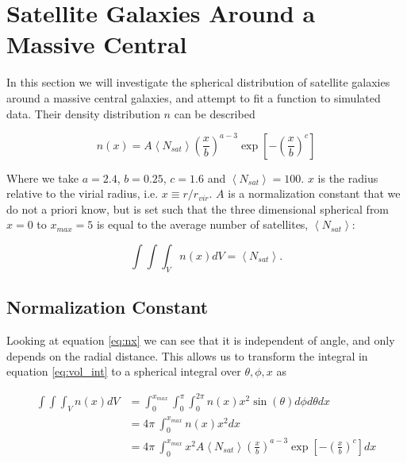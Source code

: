 \section{Satellite Galaxies Around a Massive Central}

In this section we will investigate the spherical distribution of satellite galaxies around a massive central galaxies, and attempt to fit a function to simulated data. Their density distribution $n$ can be described

\begin{equation}
    n(x) = A\left<N_{sat}\right>\left(\frac{x}{b}\right)^{a-3}\exp{\left[-\left(\frac{x}{b}\right)^{c}\right]}\label{eq:nx}
\end{equation}



Where we take $a = 2.4$, $b = 0.25$, $c = 1.6$ and $\left<N_{sat}\right> = 100$. $x$ is the radius relative to the virial radius, i.e. $x \equiv r/r_{vir}$. $A$ is a normalization constant that we do not a priori know, but is set such that the three dimensional spherical from $x = 0$ to $x_{max} = 5$ is equal to the average number of satellites, $\left<N_{sat}\right>$:

\begin{equation}
    \int\int\int_V n(x)dV = \left<N_{sat}\right>.\label{eq:vol_int}
\end{equation}



\subsection{Normalization Constant}

Looking at equation \ref{eq:nx} we can see that it is independent of angle, and only depends on the radial distance. This allows us to transform the integral in equation \ref{eq:vol_int} to a spherical integral over $\theta, \phi, x$ as

\begin{align*}
    \int\int\int_V n(x)dV &= \int_0^{x_{max}} \int_0^{\pi} \int_0^{2\pi} n(x)x^2\sin(\theta) d\phi d\theta dx \\
& = 4\pi~\int_0^{x_{max}} n(x)x^2 dx \\
&= 4\pi~\int_0^{x_{max}} x^2 A\left<N_{sat}\right>\left(\frac{x}{b}\right)^{a-3}\exp{\left[-\left(\frac{x}{b}\right)^{c}\right]} dx
\end{align*}

